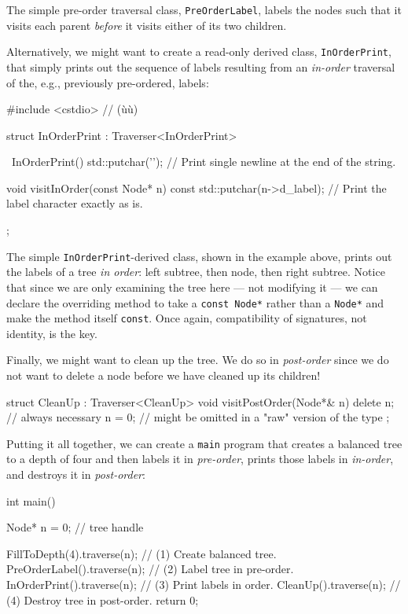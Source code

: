 \noindent The simple pre-order traversal class, \lstinline!PreOrderLabel!, labels the
nodes such that it visits each parent \emph{before} it visits either of
its two children.

Alternatively, we might want to create a read-only derived class,
\lstinline!InOrderPrint!, that simply prints out the sequence of labels
resulting from an \emph{in-order} traversal of the, e.g., previously
pre-ordered, labels:

\begin{emcppslisting}[emcppsbatch=e9]
#include <cstdio>  // (ù{}ù)

struct InOrderPrint : Traverser<InOrderPrint>
{
    ~InOrderPrint()
    {
        std::putchar('\n');  // Print single newline at the end of the string.
    }

    void visitInOrder(const Node* n) const
    {
        std::putchar(n->d_label);  // Print the label character exactly as is.
    }
};
\end{emcppslisting}

\noindent The simple \lstinline!InOrderPrint!-derived class, shown in the example above, prints out the
labels of a tree \emph{in order}: left subtree, then node, then right
subtree. Notice that since we are only examining the tree here --- not
modifying it --- we can declare the overriding method to take a
\lstinline!const!~\lstinline!Node*! rather than a \lstinline!Node*! and make the
method itself \lstinline!const!. Once again, compatibility of signatures,
not identity, is the key.

Finally, we might want to clean up the tree. We do so in
\emph{post-order} since we do not want to delete a node before we have
cleaned up its children!

\begin{emcppslisting}[emcppsbatch=e9]
struct CleanUp : Traverser<CleanUp>
{
    void visitPostOrder(Node*& n)
    {
        delete n;  // always necessary
        n = 0;     // might be omitted in a "raw" version of the type
    }
};
\end{emcppslisting}

\noindent Putting it all together, we can create a \lstinline!main! program that
creates a balanced tree to a depth of four and then labels it in
\emph{pre-order}, prints those labels in \emph{in-order}, and destroys
it in \emph{post-order}:

\begin{emcppslisting}[emcppsbatch=e9]
int main()
{
    Node* n = 0;                  // tree handle

    FillToDepth(4).traverse(n);   // (1) Create balanced tree.
    PreOrderLabel().traverse(n);  // (2) Label tree in pre-order.
    InOrderPrint().traverse(n);   // (3) Print labels in order.
    CleanUp().traverse(n);        // (4) Destroy tree in post-order.
    return 0;
}
\end{emcppslisting}

